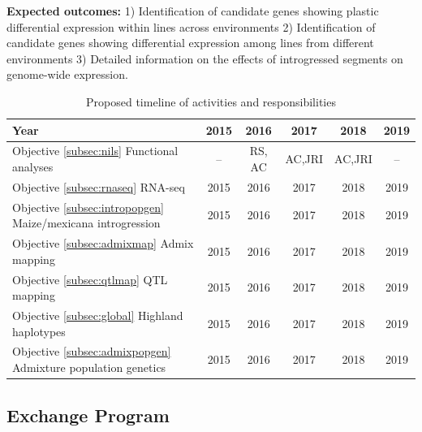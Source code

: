 {\bf Expected outcomes:} 1) Identification of candidate genes showing plastic differential expression within lines across environments 2) Identification of candidate genes showing differential expression among lines from different environments 3) Detailed information on the effects of introgressed segments on genome-wide expression. 

\begin{table}[H]
\begin{center}
\caption{Proposed timeline of activities and responsibilities}\label{tab:timeline}
\begin{tabular}{lccccc}\\\toprule  
    \rowcolor{gray!50}
Year & 2015 & 2016 & 2017 & 2018 & 2019 \\\midrule
Objective \ref{subsec:nils} Functional analyses & -- & RS, AC & AC,JRI & AC,JRI & -- \\\midrule
Objective \ref{subsec:rnaseq} RNA-seq & 2015 & 2016 & 2017 & 2018 & 2019\\\midrule
Objective \ref{subsec:intropopgen} Maize/mexicana introgression & 2015 & 2016 & 2017 & 2018 & 2019 \\\midrule
Objective \ref{subsec:admixmap} Admix mapping & 2015 & 2016 & 2017 & 2018 & 2019 \\\midrule
Objective \ref{subsec:qtlmap} QTL mapping & 2015 & 2016 & 2017 & 2018 & 2019 \\\midrule
Objective \ref{subsec:global} Highland haplotypes & 2015 & 2016 & 2017 & 2018 & 2019 \\\midrule
Objective \ref{subsec:admixpopgen} Admixture population genetics & 2015 & 2016 & 2017 & 2018 & 2019\\ \bottomrule
\end{tabular}
\end{center}
\end{table} 




\subsection*{Exchange Program} 

